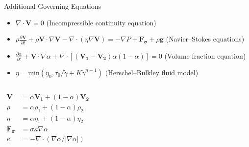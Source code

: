 \begin{frame}{Additional Governing Equations}
\begin{itemize}
\item $\nabla \cdot \boldsymbol{V} = 0$ \hfill(Incompressible continuity equation)
\end{itemize}

\begin{itemize}
\item $\rho \frac{\partial \boldsymbol{V}}{\partial t} + \rho \boldsymbol{V} \cdot \nabla\boldsymbol{V} -\nabla \cdot (\eta \nabla \boldsymbol{V}) = -\nabla P + \boldsymbol{F_{\sigma}} + \rho \boldsymbol{g}$ \hfill(Navier–Stokes equations)
\end{itemize}

\begin{itemize}
\item $\frac{\partial \alpha}{\partial t} + \boldsymbol{V} \cdot \nabla \alpha + \nabla \cdot [(\boldsymbol{V_1} - \boldsymbol{V_2})\alpha (1-\alpha)] = 0$ \hfill(Volume fraction equation)
\end{itemize}

\begin{itemize}
\item $\eta = \text{min}(\eta_0, \tau_0/\dot{\gamma}+K\dot{\gamma}^{n-1})$ \hfill(Herschel–Bulkley fluid model)
\end{itemize}
\vspace{4mm}
\begin{columns}
\begin{block}{}
\vspace{-5mm}
\begin{align*}
\boldsymbol{V} &= \alpha\boldsymbol{V_1} + (1-\alpha)\boldsymbol{V_2}\\
\rho &= \alpha\rho_1 + (1-\alpha)\rho_2\\
\eta &= \alpha\eta_1 + (1-\alpha)\eta_2\\
\boldsymbol{F_{\sigma}} &= \sigma \kappa \nabla \alpha\\
\kappa &= -\nabla \cdot ({\nabla\alpha}/{|\nabla\alpha|})
\end{align*}
\end{block}

\centering
{}

\end{columns}
\end{frame}

